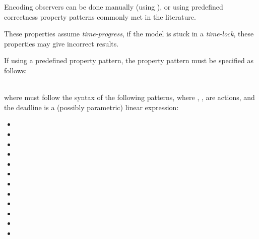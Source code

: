 Encoding observers can be done manually (using \adhoc{} \IPTA{}), or using predefined correctness property patterns commonly met in the literature.

\begin{becareful}
	These properties assume \emph{time-progress}, \ie{} if the model is stuck in a \emph{time-lock}, these properties may give incorrect results.
\end{becareful}


If using a predefined property pattern, the property pattern must be specified as follows:

\\
where  must follow the syntax of the following patterns, where , ,  are actions, and the deadline  is a (possibly parametric) linear expression:

\begin{itemize}
	\item {}
	\item {}
	\item {}
	\item {}
	\item {}
	\item {}
	\item {}
	\item {}
	\item {}
	\item {}
	\item {}
	\item {}
\end{itemize}

